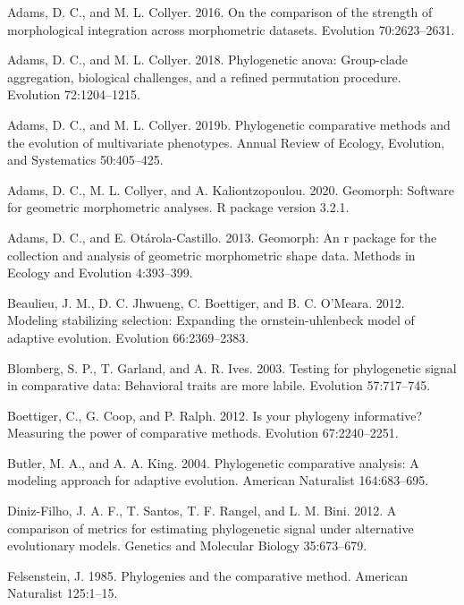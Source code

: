\documentclass[
]{article}
\begin{document}
\leavevmode\hypertarget{ref-AdamsCollyer2016}{}%
Adams, D. C., and M. L. Collyer. 2016. On the comparison of the strength
of morphological integration across morphometric datasets. Evolution
70:2623--2631.

\leavevmode\hypertarget{ref-AdamsCollyer2018b}{}%
Adams, D. C., and M. L. Collyer. 2018. Phylogenetic anova: Group-clade
aggregation, biological challenges, and a refined permutation procedure.
Evolution 72:1204--1215.

\leavevmode\hypertarget{ref-AdamsCollyer2019}{}%
Adams, D. C., and M. L. Collyer. 2019b. Phylogenetic comparative methods
and the evolution of multivariate phenotypes. Annual Review of Ecology,
Evolution, and Systematics 50:405--425.

\leavevmode\hypertarget{ref-AdamsGeomorph}{}%
Adams, D. C., M. L. Collyer, and A. Kaliontzopoulou. 2020. Geomorph:
Software for geometric morphometric analyses. R package version 3.2.1.

\leavevmode\hypertarget{ref-AdamsOtarola2013}{}%
Adams, D. C., and E. Otárola-Castillo. 2013. Geomorph: An r package for
the collection and analysis of geometric morphometric shape data.
Methods in Ecology and Evolution 4:393--399.

\leavevmode\hypertarget{ref-Beaulieu_et_al2012}{}%
Beaulieu, J. M., D. C. Jhwueng, C. Boettiger, and B. C. O'Meara. 2012.
Modeling stabilizing selection: Expanding the ornstein-uhlenbeck model
of adaptive evolution. Evolution 66:2369--2383.

\leavevmode\hypertarget{ref-Blomberg_et_al2003}{}%
Blomberg, S. P., T. Garland, and A. R. Ives. 2003. Testing for
phylogenetic signal in comparative data: Behavioral traits are more
labile. Evolution 57:717--745.

\leavevmode\hypertarget{ref-Boettiger_et_al2012}{}%
Boettiger, C., G. Coop, and P. Ralph. 2012. Is your phylogeny
informative? Measuring the power of comparative methods. Evolution
67:2240--2251.

\leavevmode\hypertarget{ref-ButlerKing2004}{}%
Butler, M. A., and A. A. King. 2004. Phylogenetic comparative analysis:
A modeling approach for adaptive evolution. American Naturalist
164:683--695.

\leavevmode\hypertarget{ref-DinizFilho2012}{}%
Diniz-Filho, J. A. F., T. Santos, T. F. Rangel, and L. M. Bini. 2012. A
comparison of metrics for estimating phylogenetic signal under
alternative evolutionary models. Genetics and Molecular Biology
35:673--679.

\leavevmode\hypertarget{ref-Felsenstein1985}{}%
Felsenstein, J. 1985. Phylogenies and the comparative method. American
Naturalist 125:1--15.
\end{document}
